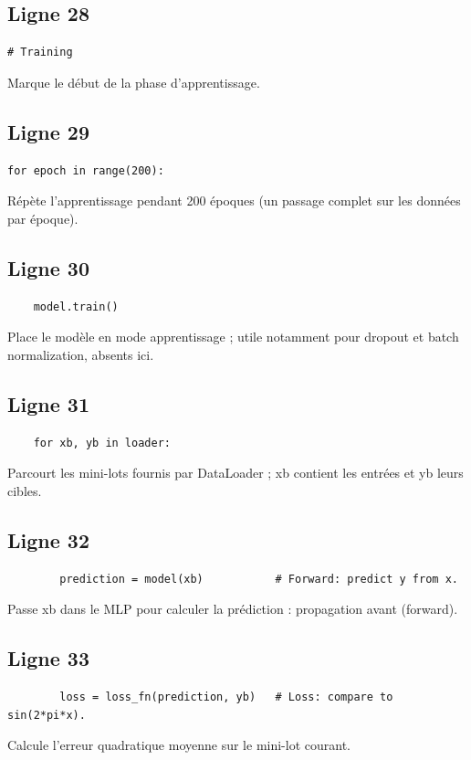 \documentclass[11pt,a4paper]{article}
\begin{document}
\subsection*{Ligne 28}
\begin{lstlisting}
# Training
\end{lstlisting}
Marque le début de la phase d'apprentissage.

\subsection*{Ligne 29}
\begin{lstlisting}
for epoch in range(200):
\end{lstlisting}
Répète l'apprentissage pendant 200 époques (un passage complet sur les données par époque).

\subsection*{Ligne 30}
\begin{lstlisting}
    model.train()
\end{lstlisting}
Place le modèle en mode apprentissage ; utile notamment pour dropout et batch normalization, absents ici.

\subsection*{Ligne 31}
\begin{lstlisting}
    for xb, yb in loader:
\end{lstlisting}
Parcourt les mini-lots fournis par DataLoader ; xb contient les entrées et yb leurs cibles.

\subsection*{Ligne 32}
\begin{lstlisting}
        prediction = model(xb)           # Forward: predict y from x.
\end{lstlisting}
Passe xb dans le MLP pour calculer la prédiction : propagation avant (forward).

\subsection*{Ligne 33}
\begin{lstlisting}
        loss = loss_fn(prediction, yb)   # Loss: compare to sin(2*pi*x).
\end{lstlisting}
Calcule l'erreur quadratique moyenne sur le mini-lot courant.
\end{document}
